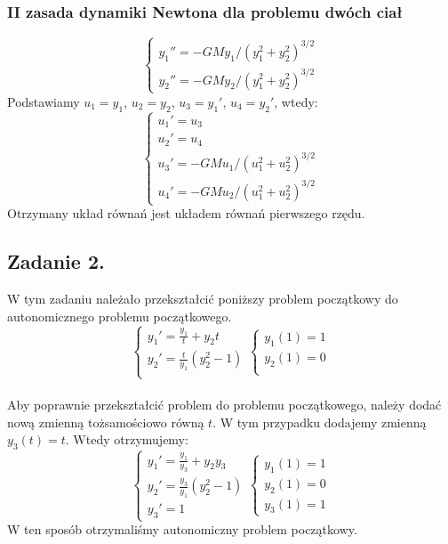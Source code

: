 \documentclass{article}
\begin{document}
\subsubsection{II zasada dynamiki Newtona dla problemu dwóch ciał}
\begin{equation}
    \begin{cases}
        y_1'' = -GMy_1/(y_1^2+y_2^2)^{3/2} \\
        y_2'' = -GMy_2/(y_1^2+y_2^2)^{3/2}
    \end{cases} \nonumber
\end{equation}
Podstawiamy $u_1 = y_1$, $u_2 = y_2$, $u_3 = y_1'$, $u_4 = y_2'$, wtedy:
\begin{equation}
    \begin{cases}
        u_1' = u_3 \\
        u_2' = u_4 \\
        u_3' = -GMu_1/(u_1^2+u_2^2)^{3/2} \\
        u_4' = -GMu_2/(u_1^2+u_2^2)^{3/2}
    \end{cases} \nonumber
\end{equation}
Otrzymany układ równań jest układem równań pierwszego rzędu.

\subsection{Zadanie 2.}
W tym zadaniu należało przekształcić poniższy problem początkowy do autonomicznego problemu początkowego.
\begin{equation}
    \begin{cases}
        y_1' = \frac{y_1}{t} + y_2t \\
        y_2' = \frac{t}{y_1}(y_2^2 - 1) \\
    \end{cases} \nonumber
    \begin{cases}
        y_1(1) = 1 \\
        y_2(1) = 0 \\
    \end{cases} \nonumber
\end{equation}
\\
Aby poprawnie przekształcić problem do problemu początkowego, należy dodać nową zmienną tożsamościowo równą $t$. W tym przypadku dodajemy zmienną $y_3(t) = t$. Wtedy otrzymujemy:
\begin{equation}
    \begin{cases}
        y_1' = \frac{y_1}{y_3} + y_2y_3 \\
        y_2' = \frac{y_3}{y_1}(y_2^2 - 1) \\
        y_3' = 1
    \end{cases} \nonumber
    \begin{cases}
        y_1(1) = 1 \\
        y_2(1) = 0 \\
        y_3(1) = 1
    \end{cases} \nonumber
\end{equation}
W ten sposób otrzymaliśmy autonomiczny problem początkowy.
\end{document}
